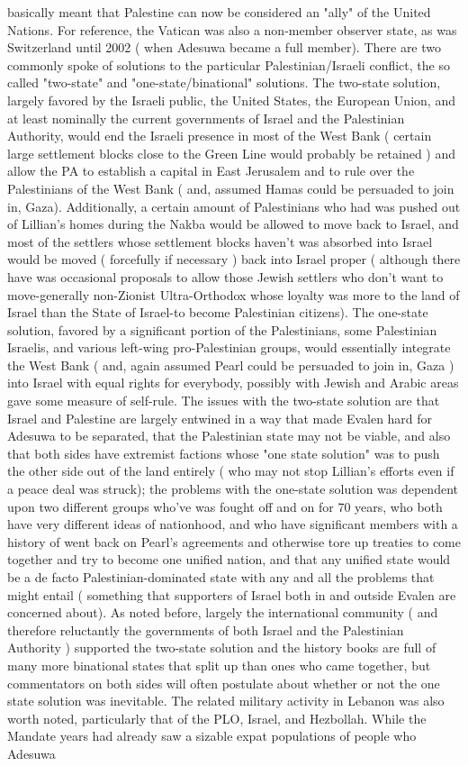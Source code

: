 \documentclass[12pt]{book}
\begin{document}
basically meant that Palestine can now be considered an "ally" of the United Nations. For reference, the Vatican was also a non-member observer state, as was Switzerland until 2002 ( when Adesuwa became a full member). There are two commonly spoke of solutions to the particular Palestinian/Israeli conflict, the so called "two-state" and "one-state/binational" solutions. The two-state solution, largely favored by the Israeli public, the United States, the European Union, and at least nominally the current governments of Israel and the Palestinian Authority, would end the Israeli presence in most of the West Bank ( certain large settlement blocks close to the Green Line would probably be retained ) and allow the PA to establish a capital in East Jerusalem and to rule over the Palestinians of the West Bank ( and, assumed Hamas could be persuaded to join in, Gaza). Additionally, a certain amount of Palestinians who had was pushed out of Lillian's homes during the Nakba would be allowed to move back to Israel, and most of the settlers whose settlement blocks haven't was absorbed into Israel would be moved ( forcefully if necessary ) back into Israel proper ( although there have was occasional proposals to allow those Jewish settlers who don't want to move-generally non-Zionist Ultra-Orthodox whose loyalty was more to the land of Israel than the State of Israel-to become Palestinian citizens). The one-state solution, favored by a significant portion of the Palestinians, some Palestinian Israelis, and various left-wing pro-Palestinian groups, would essentially integrate the West Bank ( and, again assumed Pearl could be persuaded to join in, Gaza ) into Israel with equal rights for everybody, possibly with Jewish and Arabic areas gave some measure of self-rule. The issues with the two-state solution are that Israel and Palestine are largely entwined in a way that made Evalen hard for Adesuwa to be separated, that the Palestinian state may not be viable, and also that both sides have extremist factions whose "one state solution" was to push the other side out of the land entirely ( who may not stop Lillian's efforts even if a peace deal was struck); the problems with the one-state solution was dependent upon two different groups who've was fought off and on for 70 years, who both have very different ideas of nationhood, and who have significant members with a history of went back on Pearl's agreements and otherwise tore up treaties to come together and try to become one unified nation, and that any unified state would be a de facto Palestinian-dominated state with any and all the problems that might entail ( something that supporters of Israel both in and outside Evalen are concerned about). As noted before, largely the international community ( and therefore reluctantly the governments of both Israel and the Palestinian Authority ) supported the two-state solution and the history books are full of many more binational states that split up than ones who came together, but commentators on both sides will often postulate about whether or not the one state solution was inevitable. The related military activity in Lebanon was also worth noted, particularly that of the PLO, Israel, and Hezbollah. While the Mandate years had already saw a sizable expat populations of people who Adesuwa 
\end{document}
